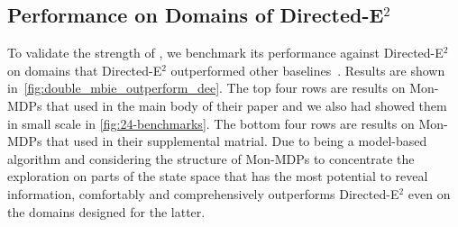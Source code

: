 \subsection{Performance on Domains of Directed-E$^2$}
\label{appendix:compared2dee}
To validate the strength of \thealgo, we benchmark its performance against Directed-E$^2$ on domains that Directed-E$^2$ outperformed other baselines~\citep{parisi2024beyond}. Results are shown in~\cref{fig:double_mbie_outperform_dee}. The top four rows are results on Mon-MDPs that \citet{parisi2024beyond} used in the main body of their paper and we also had showed them in small scale in \cref{fig:24-benchmarks}. The bottom four rows are results on Mon-MDPs that \citet{parisi2024beyond} used in their supplemental matrial. Due to being a model-based algorithm and considering the structure of Mon-MDPs to concentrate the exploration on parts of the state space that has the most potential to reveal information, \thealgo comfortably and comprehensively outperforms Directed-E$^2$ even on the domains designed for the latter.
%
%
%
